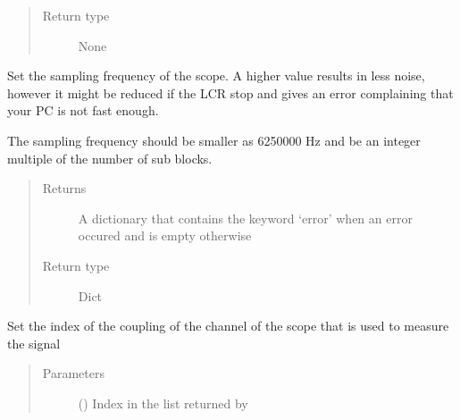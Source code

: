 \documentclass[letterpaper,10pt,english]{sphinxmanual}
\begin{document}
\begin{fulllineitems}
\begin{fulllineitems}
\begin{quote}
\begin{description}
\item[{Return type}] \leavevmode
\sphinxAtStartPar
None

\end{description}\end{quote}

\end{fulllineitems}


\begin{fulllineitems}
\label{\detokenize{index:TiePieLCR_settings.TiePieLCR_settings.set_sample_frequency}}
\sphinxAtStartPar
Set the sampling frequency of the scope. A higher value results in less noise, however it might be reduced if the LCR stop and gives an error complaining that your PC is not fast enough.

\sphinxAtStartPar
The sampling frequency should be smaller as 6250000 Hz and be an integer multiple of the number of sub blocks.
\begin{quote}\begin{description}
\item[{Returns}] \leavevmode
\sphinxAtStartPar
A dictionary that contains the keyword ‘error’ when an error occured and is empty otherwise

\item[{Return type}] \leavevmode
\sphinxAtStartPar
Dict

\end{description}\end{quote}

\end{fulllineitems}


\begin{fulllineitems}
\label{\detokenize{index:TiePieLCR_settings.TiePieLCR_settings.set_signal_scope_coupling}}
\sphinxAtStartPar
Set the index of the coupling of the channel of the scope that is used to measure the signal
\begin{quote}\begin{description}
\item[{Parameters}] \leavevmode
\sphinxAtStartPar
{} () \textendash{} Index in the list returned by {\hyperref[\detokenize{index:TiePieLCR_settings.TiePieLCR_settings.get_scope_coupling_name_list}]{}}


\end{description}
\end{quote}
\end{fulllineitems}
\end{fulllineitems}
\end{document}
